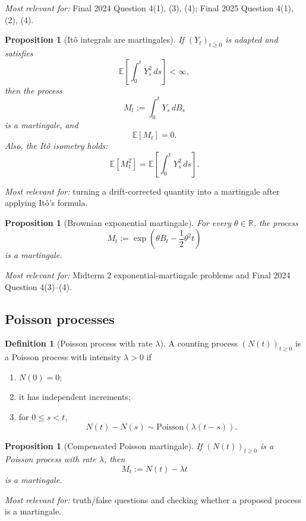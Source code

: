 \documentclass[11pt]{article}
\newtheorem{proposition}[theorem]{Proposition}
\theoremstyle{definition}
\newtheorem{definition}[theorem]{Definition}
\begin{document}
\emph{Most relevant for:} Final 2024 Question 4(1), (3), (4); Final 2025 Question 4(1), (2), (4).

\begin{proposition}[It\^o integrals are martingales]
If $(Y_t)_{t\ge 0}$ is adapted and satisfies
\[
\mathbb E\!\left[\int_0^t Y_s^2\,ds\right] < \infty,
\]
then the process
\[
M_t := \int_0^t Y_s\,dB_s
\]
is a martingale, and
\[
\mathbb E[M_t]=0.
\]
Also, the It\^o isometry holds:
\[
\mathbb E[M_t^2] = \mathbb E\!\left[\int_0^t Y_s^2\,ds\right].
\]
\end{proposition}

\emph{Most relevant for:} turning a drift-corrected quantity into a martingale after applying It\^o's formula.

\begin{proposition}[Brownian exponential martingale]
For every $\theta\in\mathbb R$, the process
\[
M_t := \exp\!\left(\theta B_t - \frac12 \theta^2 t\right)
\]
is a martingale.
\end{proposition}

\emph{Most relevant for:} Midterm 2 exponential-martingale problems and Final 2024 Question 4(3)--(4).

\subsection{Poisson processes}

\begin{definition}[Poisson process with rate $\lambda$]
A counting process $(N(t))_{t\ge 0}$ is a Poisson process with intensity $\lambda>0$ if
\begin{enumerate}[label=(\roman*)]
    \item $N(0)=0$;
    \item it has independent increments;
    \item for $0\le s<t$,
    \[
    N(t)-N(s)\sim \mathrm{Poisson}(\lambda(t-s)).
    \]
\end{enumerate}
\end{definition}

\begin{proposition}[Compensated Poisson martingale]
If $(N(t))_{t\ge 0}$ is a Poisson process with rate $\lambda$, then
\[
M_t := N(t)-\lambda t
\]
is a martingale.
\end{proposition}

\emph{Most relevant for:} truth/false questions and checking whether a proposed process is a martingale.
\end{document}

